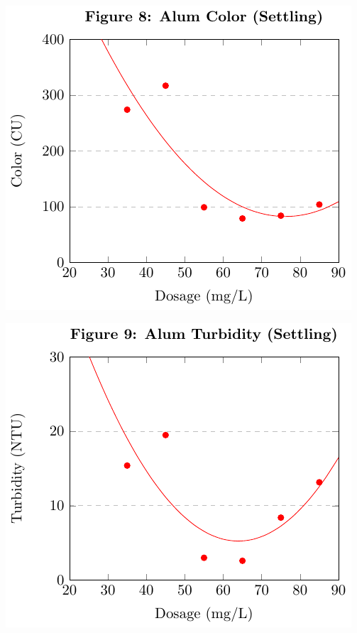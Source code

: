 \begin{center}
\begin{minipage}{.5\textwidth}
    \centering
    \includegraphics*[page=1]{figs/fig8.pdf}
    \end{minipage}%
    \begin{minipage}{.5\textwidth}
    \centering
    \includegraphics*[page=1]{figs/fig9.pdf}
    \end{minipage}
    \vspace{6mm}

\end{center}
